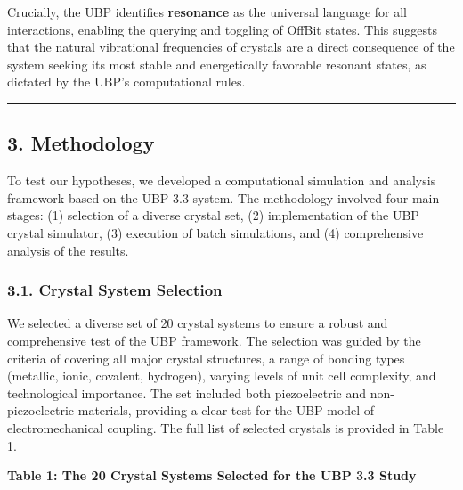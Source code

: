 Crucially, the UBP identifies \textbf{resonance} as the universal
language for all interactions, enabling the querying and toggling of
OffBit states. This suggests that the natural vibrational frequencies of
crystals are a direct consequence of the system seeking its most stable
and energetically favorable resonant states, as dictated by the UBP's
computational rules.

\begin{center}\rule{0.5\linewidth}{0.5pt}\end{center}

\subsection{3. Methodology}\label{methodology}

To test our hypotheses, we developed a computational simulation and
analysis framework based on the UBP 3.3 system. The methodology involved
four main stages: (1) selection of a diverse crystal set, (2)
implementation of the UBP crystal simulator, (3) execution of batch
simulations, and (4) comprehensive analysis of the results.

\subsubsection{3.1. Crystal System
Selection}\label{crystal-system-selection}

We selected a diverse set of 20 crystal systems to ensure a robust and
comprehensive test of the UBP framework. The selection was guided by the
criteria of covering all major crystal structures, a range of bonding
types (metallic, ionic, covalent, hydrogen), varying levels of unit cell
complexity, and technological importance. The set included both
piezoelectric and non-piezoelectric materials, providing a clear test
for the UBP model of electromechanical coupling. The full list of
selected crystals is provided in Table 1.

\textbf{Table 1: The 20 Crystal Systems Selected for the UBP 3.3 Study}

